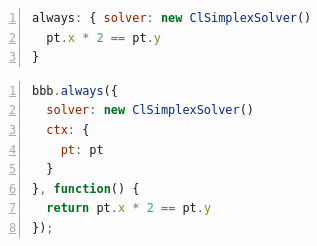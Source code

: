 
\begin{lstlisting}[label=lst:implementation-cassowaryexample,caption={A simple constraint before source code transformation},float,numbers=left,language=JavaScript,morekeywords={always}]
always: { solver: new ClSimplexSolver()
  pt.x * 2 == pt.y
}
\end{lstlisting}

\begin{lstlisting}[label=lst:implementation-cassowaryexamplesourcetransformed,caption={A simple constraint after source code transformation},float,numbers=left,language=JavaScript,morekeywords={}]
bbb.always({
  solver: new ClSimplexSolver() 
  ctx: {
    pt: pt
  }
}, function() {
  return pt.x * 2 == pt.y
});
\end{lstlisting}

